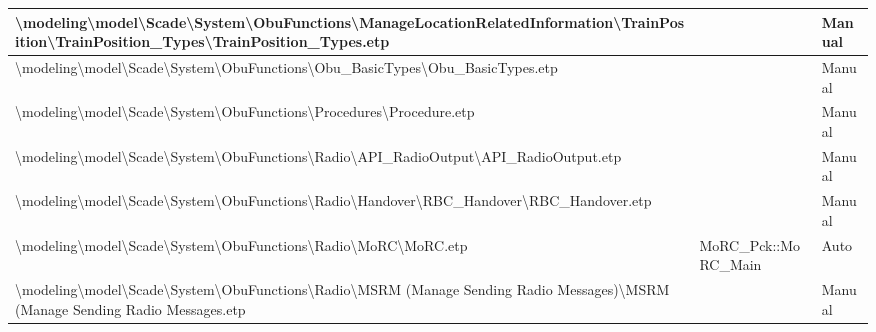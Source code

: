 \begin{longtable}{|>{\RaggedRight}p{}|>{\RaggedRight}p{}|>{\RaggedRight}p{}|}
\hline
\textbackslash \allowbreak modeling\textbackslash \allowbreak model\textbackslash \allowbreak Scade\textbackslash \allowbreak System\textbackslash \allowbreak ObuFunctions\textbackslash \allowbreak ManageLocationRelatedInformation\textbackslash \allowbreak TrainPosition\textbackslash \allowbreak TrainPosition\_\allowbreak Types\textbackslash \allowbreak TrainPosition\_\allowbreak Types.etp& &Manual\\
\hline
\textbackslash \allowbreak modeling\textbackslash \allowbreak model\textbackslash \allowbreak Scade\textbackslash \allowbreak System\textbackslash \allowbreak ObuFunctions\textbackslash \allowbreak Obu\_\allowbreak BasicTypes\textbackslash \allowbreak Obu\_\allowbreak BasicTypes.etp& &Manual\\
\hline
\textbackslash \allowbreak modeling\textbackslash \allowbreak model\textbackslash \allowbreak Scade\textbackslash \allowbreak System\textbackslash \allowbreak ObuFunctions\textbackslash \allowbreak Procedures\textbackslash \allowbreak Procedure.etp& &Manual\\
\hline
\textbackslash \allowbreak modeling\textbackslash \allowbreak model\textbackslash \allowbreak Scade\textbackslash \allowbreak System\textbackslash \allowbreak ObuFunctions\textbackslash \allowbreak Radio\textbackslash \allowbreak API\_\allowbreak RadioOutput\textbackslash \allowbreak API\_\allowbreak RadioOutput.etp& &Manual\\
\hline
\textbackslash \allowbreak modeling\textbackslash \allowbreak model\textbackslash \allowbreak Scade\textbackslash \allowbreak System\textbackslash \allowbreak ObuFunctions\textbackslash \allowbreak Radio\textbackslash \allowbreak Handover\textbackslash \allowbreak RBC\_\allowbreak Handover\textbackslash \allowbreak RBC\_\allowbreak Handover.etp& &Manual\\
\hline
\textbackslash \allowbreak modeling\textbackslash \allowbreak model\textbackslash \allowbreak Scade\textbackslash \allowbreak System\textbackslash \allowbreak ObuFunctions\textbackslash \allowbreak Radio\textbackslash \allowbreak MoRC\textbackslash \allowbreak MoRC.etp&MoRC\_\allowbreak Pck::MoRC\_\allowbreak Main&Auto\\
\hline
\textbackslash \allowbreak modeling\textbackslash \allowbreak model\textbackslash \allowbreak Scade\textbackslash \allowbreak System\textbackslash \allowbreak ObuFunctions\textbackslash \allowbreak Radio\textbackslash \allowbreak MSRM (Manage Sending Radio Messages)\textbackslash \allowbreak MSRM (Manage Sending Radio Messages.etp& &Manual\\

\end{longtable}
